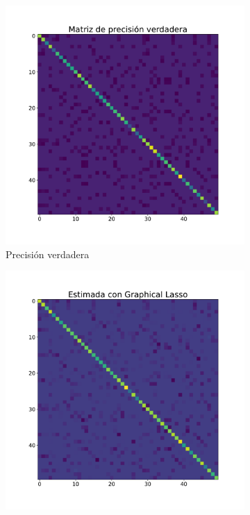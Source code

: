 \documentclass{article}
\begin{document}
\begin{figure}[htb]
    \centering
    \begin{subfigure}[t]{0.32\linewidth}
        \centering
        \includegraphics[width=\textwidth]{imagenes/graphical_lasso/true_precision_sample.pdf}
        \caption{Precisión verdadera}
        \label{fig:graphical_lasso_true_precision}
    \end{subfigure}\hfill
    \begin{subfigure}[t]{0.32\linewidth}
        \centering
        \includegraphics[width=\textwidth]{imagenes/graphical_lasso/graphical_sample.pdf}

\end{subfigure}
\end{figure}
\end{document}
